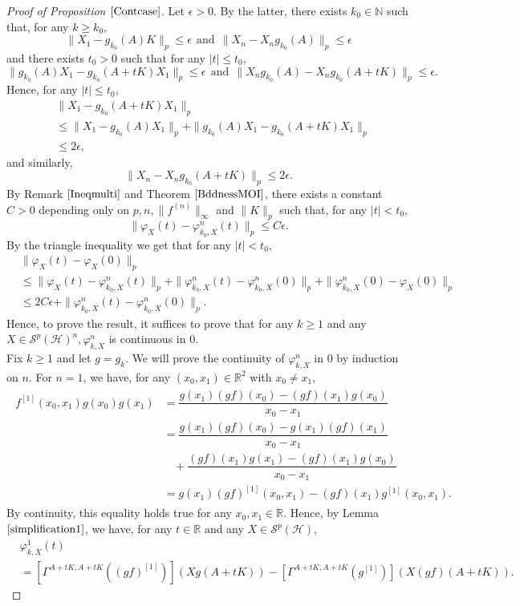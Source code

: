 \documentclass[12pt]{amsart}
\theoremstyle{remark}
\begin{document}
\begin{proof}[Proof of Proposition $\ref{Contcase}$]
Let $\epsilon > 0$. By the latter, there exists $k_0 \in \mathbb{N}$ such that, for any $k\geq k_0$,
$$
\| X_1 - g_{k_0}(A) K\|_p \leq \epsilon \ \ \text{and} \ \ \| X_n - X_n g_{k_0}(A) \|_p \leq \epsilon
$$
and there exists $t_0 > 0$ such that for any $|t| \leq t_0$,
$$
\| g_{k_0}(A)X_1 - g_{k_0}(A+tK) X_1\|_p \leq \epsilon \ \ \text{and} \ \ \| X_n g_{k_0}(A) - X_n g_{k_0}(A+tK) \|_p \leq \epsilon.
$$
Hence, for any $|t| \leq t_0$,
\begin{align*}
& \| X_1 - g_{k_0}(A+tK) X_1\|_p \\
& \leq \| X_1 - g_{k_0}(A) X_1\|_p + \| g_{k_0}(A)X_1 - g_{k_0}(A+tK) X_1\|_p \\
& \leq 2 \epsilon,
\end{align*}
and similarly,
$$
\| X_n - X_n g_{k_0}(A+tK) \|_p \leq 2\epsilon.
$$
By Remark $\ref{Ineqmulti}$ and Theorem $\ref{BddnessMOI}$, there exists a constant $C > 0$ depending only on $p, n, \|f^{(n)}\|_{\infty}$ and $\|K\|_p$ such that, for any $|t| < t_0$,
$$
\| \varphi_X(t) - \varphi_{k_0,X}^n(t) \|_p \leq C \epsilon.
$$
By the triangle inequality we get that for any $|t| < t_0$,
\begin{align*}
& \| \varphi_X(t) - \varphi_X(0) \|_p \\
& \leq \| \varphi_X(t) - \varphi_{k_0,X}^n(t) \|_p + \|\varphi_{k_0,X}^n(t) - \varphi_{k_0,X}^n(0) \|_p + \| \varphi_{k_0,X}^n(0) - \varphi_X(0)\|_p \\
& \leq 2C \epsilon + \|\varphi_{k_0,X}^n(t) - \varphi_{k_0,X}^n(0) \|_p.
\end{align*}
Hence, to prove the result, it suffices to prove that for any $k\geq 1$ and any $X \in \mathcal{S}^p(\mathcal{H})^n, \varphi_{k,X}^n$ is continuous in $0$.\\

Fix $k\geq 1$ and let $g = g_k$. We will prove the continuity of $\varphi_{k,X}^n$ in $0$ by induction on $n$. For $n=1$, we have, for any $(x_0,x_1)\in \mathbb{R}^2$ with $x_0 \neq x_1$,
\begin{align}\label{calculsn1}
\begin{split}
f^{[1]}(x_0,x_1)g(x_0)g(x_1)
& = \dfrac{g(x_1)(gf)(x_0) - (gf)(x_1) g(x_0)}{x_0 - x_1} \\
& = \dfrac{g(x_1)(gf)(x_0) - g(x_1)(gf)(x_1)}{x_0 - x_1} \\
& \ \ \ \ + \dfrac{(gf)(x_1)g(x_1) - (gf)(x_1) g(x_0)}{x_0 - x_1} \\
& = g(x_1) (gf)^{[1]}(x_0,x_1) - (gf)(x_1)g^{[1]}(x_0,x_1).
\end{split}
\end{align}
By continuity, this equality holds true for any $x_0,x_1 \in \mathbb{R}$. Hence, by Lemma $\ref{simplification1}$, we have, for any $t\in \mathbb{R}$ and any $X\in \mathcal{S}^p(\mathcal{H})$,
\begin{align*}
& \varphi_{k,X}^1(t) \\
& = \left[ \Gamma^{A+tK, A+tK}((gf)^{[1]}) \right](Xg(A+tK)) - \left[ \Gamma^{A+tK, A+tK}(g^{[1]}) \right](X(gf)(A+tK)).
\end{align*}


\end{proof}
\end{document}
